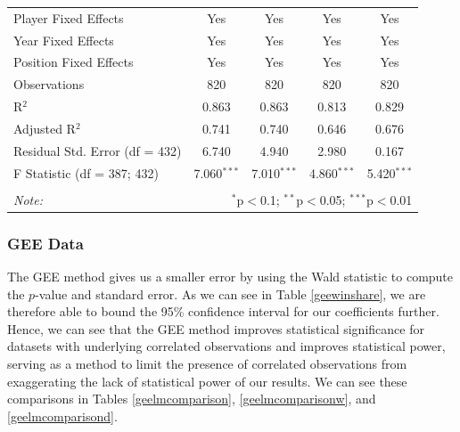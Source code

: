 \documentclass[12pt]{article}
\begin{document}
\begin{landscape}
\begin{table}[!htbp]
\begin{tabular}{@{\extracolsep{5pt}}lcccc}
				Player Fixed Effects & Yes & Yes & Yes & Yes \\ 
				Year Fixed Effects & Yes & Yes & Yes & Yes \\ 
				Position Fixed Effects & Yes & Yes & Yes & Yes \\ 
				Observations & 820 & 820 & 820 & 820 \\ 
				R$^{2}$ & 0.863 & 0.863 & 0.813 & 0.829 \\ 
				Adjusted R$^{2}$ & 0.741 & 0.740 & 0.646 & 0.676 \\ 
				Residual Std. Error (df = 432) & 6.740 & 4.940 & 2.980 & 0.167 \\ 
				F Statistic (df = 387; 432) & 7.060$^{***}$ & 7.010$^{***}$ & 4.860$^{***}$ & 5.420$^{***}$ \\ 
				\hline 
				\hline \\[-1.8ex] 
				\textit{Note:}  & \multicolumn{4}{r}{$^{*}$p$<$0.1; $^{**}$p$<$0.05; $^{***}$p$<$0.01} \\ 
			\end{tabular} 
		\end{table}
	\end{landscape}
	
	
	\subsubsection{GEE Data}
	
	The GEE method gives us a smaller error by using the Wald statistic to compute the $p$-value and standard error. As we can see in Table \ref{geewinshare}, we are therefore able to bound the 95\% confidence interval for our coefficients further. Hence, we can see that the GEE method improves statistical significance for datasets with underlying correlated observations and improves statistical power, serving as a method to limit the presence of correlated observations from exaggerating the lack of statistical power of our results. We can see these comparisons in Tables \ref{geelmcomparison}, \ref{geelmcomparisonw}, and \ref{geelmcomparisond}.
	
\end{document}
